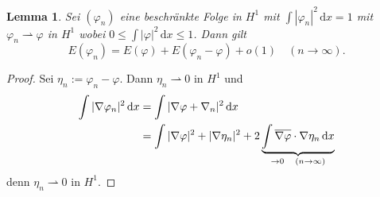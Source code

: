 \documentclass[
paper=a4,
bibtotocnumbered,
liststotocnumbered,
tablecaptionabove,
pointlessnumbers,
twoside,
openright,
10pt
]
{report}
\let\Re\relax\let\Im\relax
\DeclareMathOperator{\Re}{Re}
\DeclareMathOperator{\Im}{Im}
\let\phi\varphi
\newtheorem{lem}[thm]{Lemma}
\theoremstyle{definition}
\numberwithin{equation}{chapter}
\begin{document}
\begin{lem}\label{5.12}
Sei $(\phi_n)$ eine beschränkte Folge in $H^1$ mit $\int |\phi_n|^2\, \mathrm dx =1$ mit $\phi_n \rightharpoonup \phi$ in $H^1$ wobei $0 \le \int |\phi|^2\, \mathrm dx \le 1$. Dann gilt 
\begin{equation}
E(\phi_n) = E(\phi) + E(\phi_n - \phi) + o(1) \quad (n\to \infty).
\end{equation}
\end{lem}
\begin{proof}
Sei $\eta_n := \phi_n - \phi$. Dann $\eta_n \rightharpoonup 0$ in $H^1$ und
\begin{align*}
\int |\nabla \phi_n|^2\, \mathrm dx &= \int |\nabla \phi + \nabla_n|^2\, \mathrm dx \\
&=\int |\nabla \phi|^2 + |\nabla \eta_n|^2+ 2\Re \underbrace{\int \overline{\nabla \phi} \cdot \nabla \eta_n \, \mathrm dx}_{\to 0 \quad (n\to \infty)}
\end{align*}
denn $\eta_n \rightharpoonup 0$ in $H^1$.


\end{proof}
\end{document}
